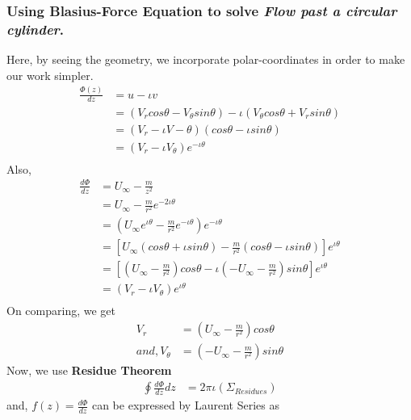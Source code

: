 \documentclass{book}
\begin{document}
\subsubsection{Using Blasius-Force Equation to solve \textit{Flow past a circular cylinder}.}
Here, by seeing the geometry, we incorporate polar-coordinates in order to make our work simpler.
\begin{equation*}
\begin{split}
\frac{\Phi(z)}{dz}&=u-\iota v \\
&=(V_rcos\theta-V_\theta sin\theta)-\iota (V_\theta cos\theta + V_rsin\theta)\\
&=(V_r-\iota V-\theta)(cos\theta -\iota sin\theta)\\
&=(V_r-\iota V_\theta)e^{-\iota \theta}\\
\end{split}
\end{equation*}
Also, 
\begin{equation*}
\begin{split}
\frac{d\Phi}{dz}&=U_{\infty}-\frac{m}{z^2}\\
&=U_\infty-\frac{m}{r^2}e^{-2\iota \theta}\\
&=(U_\infty e^{\iota \theta}-\frac{m}{r^2}e^{-\iota \theta})e^{-\iota \theta}\\
&=[U_\infty(cos\theta+\iota sin\theta)-\frac{m}{r^2}(cos\theta-\iota sin\theta)]e^{\iota \theta}\\
&=[(U_\infty-\frac{m}{r^2})cos\theta-\iota(-U_\infty-\frac{m}{r^2})sin\theta]e^{\iota \theta}\\
&=(V_r-\iota V_\theta)e^{\iota \theta}\\
\end{split}
\end{equation*}
On comparing, we get \textemdash
\begin{equation*}
\begin{split}
V_r&=(U_\infty-\frac{m}{r^2})cos\theta \\
and,V_\theta&=(-U_\infty-\frac{m}{r^2})sin\theta
\end{split}
\end{equation*}
Now, we use \textbf{Residue Theorem} \textemdash
\begin{equation*}
\begin{split}
\oint \frac{d\Phi}{dz} dz &= 2\pi \iota (\Sigma_{Residues})
\end{split}
\end{equation*}
and, $f(z)=\frac{d\Phi}{dz}$ can be expressed by Laurent Series as \textemdash
\end{document}
